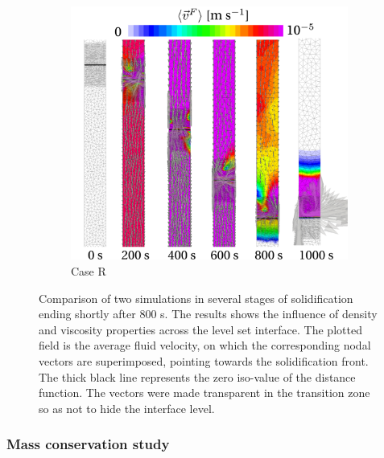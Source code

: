 \begin{figure}[htbp]
\begin{subfigure}{0.6\textwidth}
    \includegraphics[width=\textwidth]{Chapter5/Graphics/1d/ls_velocity_differentprops.pdf}
	\caption{Case R}
    \label{fig:1dalsi7_differentprops}
  \end{subfigure}
\caption{Comparison of two simulations in several stages of solidification ending shortly after 800 s.
The results shows the influence of density and viscosity properties across the level set interface.
The plotted field is the average fluid velocity, on which the corresponding nodal vectors are superimposed, pointing
towards the solidification front. The thick black line represents the zero iso-value of the distance function.
The vectors were made transparent in the transition zone so as not to hide the interface level.}
\label{fig:1dalsi7_caseA1R}
\end{figure}

\subsubsection{Mass conservation study}

